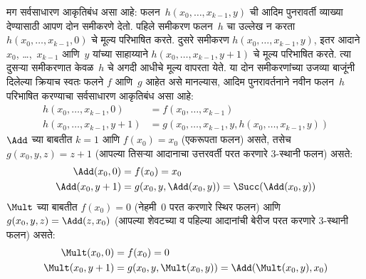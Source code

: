 \documentclass[../../../include/open-logic-section]{subfiles}
\begin{document}
मग सर्वसाधारण आकृतिबंध असा आहे: फलन~$h(x_0, \dots, x_{k-1}, y)$ ची
आदिम पुनरावर्ती व्याख्या देण्यासाठी आपण दोन समीकरणे देतो. पहिले समीकरण
फलन~$h$ चा उल्लेख न करता $h(x_0, \dots, x_{k-1}, 0)$ चे मूल्य
परिभाषित करते. दुसरे समीकरण $h(x_0, \dots, x_{k-1}, y)$, इतर आदाने
$x_0$, \dots,~$x_{k-1}$ आणि~$y$ यांच्या साहाय्याने $h(x_0,
\dots, x_{k-1}, y+1)$ चे मूल्य परिभाषित करते. त्या दुसऱ्या समीकरणात
केवळ~$h$ चे अगदी आधीचे मूल्य वापरता येते. या दोन समीकरणांच्या उजव्या
बाजूंनी दिलेल्या क्रियाच स्वतः फलने $f$ आणि~$g$ आहेत असे मानल्यास,
आदिम पुनरावर्तनाने नवीन फलन~$h$ परिभाषित करण्याचा सर्वसाधारण आकृतिबंध
असा आहे:
\begin{align*}
  h(x_0, \dots, x_{k-1}, 0) & = f(x_0, \dots, x_{k-1})\\
  h(x_0, \dots, x_{k-1}, y+1) & =
  g(x_0, \dots, x_{k-1}, y, h(x_0, \dots, x_{k-1}, y))
\end{align*}
$\Add$ च्या बाबतीत $k=1$ आणि $f(x_0) = x_0$ (एकरूपता फलन) असते,
तसेच $g(x_0, y, z) = z + 1$ (आपल्या तिसऱ्या आदानाचा उत्तरवर्ती
परत करणारे $3$-स्थानी फलन) असते:
\begin{align*}
  \Add(x_0, 0) & = f(x_0) = x_0\\
  \Add(x_0, y+1) & = g(x_0, y, \Add(x_0, y)) =
  \Succ(\Add(x_0, y))
\end{align*}
$\Mult$ च्या बाबतीत $f(x_0) = 0$ (नेहमी~$0$ परत करणारे स्थिर फलन)
आणि $g(x_0, y, z) = \Add(z,x_0)$ (आपल्या शेवटच्या व पहिल्या आदानांची
बेरीज परत करणारे $3$-स्थानी फलन) असते:
\begin{align*}
  \Mult(x_0,0) & =  f(x_0) = 0 \\
  \Mult(x_0,y+1) & =  g(x_0, y, \Mult(x_0,y)) =
  \Add(\Mult(x_0,y), x_0)
\end{align*}
\end{document}
